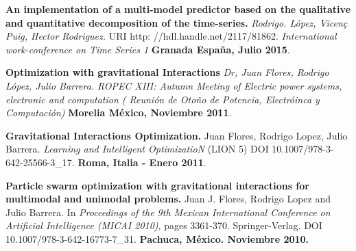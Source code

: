 \documentclass[10pt]{article}
\newenvironment{innerlist}[1][\enskip\textbullet]%
        {\begin{compactitem}[#1]}{\end{compactitem}}
\begin{document}
\begin{innerlist}
\item \textbf{An implementation of a multi-model predictor based on the qualitative and quantitative decomposition of the time-series.} \textit{Rodrigo. López, Vicen\c{c} Puig, Hector Rodriguez.} URI http: //hdl.handle.net/2117/81862. \textit{International work-conference on Time Series 1 
} \textbf{Granada España, Julio 2015}.

\item \textbf{Optimization with gravitational Interactions} \textit{Dr, Juan Flores, Rodrigo López, Julio Barrera.}   \textit{ROPEC XIII: Autumn Meeting of Electric power systems, electronic and computation ( Reunión de Oto\~no de Potencia, Electróinca y Computación)} \textbf{ Morelia México, Noviembre 2011}.

\item \textbf{Gravitational Interactions Optimization.} Juan Flores, Rodrigo Lopez, Julio Barrera.  \textit{Learning and Intelligent OptimizatioN}  (LION 5) DOI 10.1007/978-3-642-25566-3\_17. \textbf{Roma, Italia - Enero 2011}. 

\item \textbf{Particle swarm optimization with gravitational interactions for multimodal and unimodal problems.} Juan J. Flores, Rodrigo Lopez and Julio Barrera.  In \textit{Proceedings of the 9th Mexican International Conference on Artificial Intelligence (MICAI 2010)}, pages 3361-370. Springer-Verlag. DOI 10.1007/978-3-642-16773-7\_31. \textbf{Pachuca, México. Noviembre 2010.}

\end{innerlist}
\end{document}
